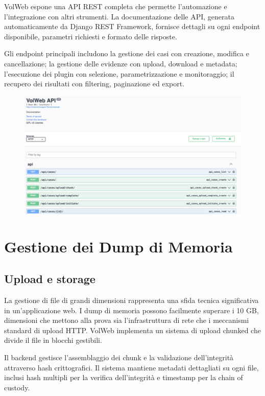 VolWeb espone una API REST completa che permette l'automazione e l'integrazione con altri strumenti. La documentazione delle API, generata automaticamente da Django REST Framework, fornisce dettagli su ogni endpoint disponibile, parametri richiesti e formato delle risposte.

Gli endpoint principali includono la gestione dei casi con creazione, modifica e cancellazione; la gestione delle evidenze con upload, download e metadata; l'esecuzione dei plugin con selezione, parametrizzazione e monitoraggio; il recupero dei risultati con filtering, paginazione ed export.

\begin{figure}[H]
    \centering
    \includegraphics[width=1\linewidth]{images/volweb-original/volweb-swagger.png}
\end{figure}

\section{Gestione dei Dump di Memoria}

\subsection{Upload e storage}

La gestione di file di grandi dimensioni rappresenta una sfida tecnica significativa in un'applicazione web. I dump di memoria possono facilmente superare i 10 GB, dimensioni che mettono alla prova sia l'infrastruttura di rete che i meccanismi standard di upload HTTP. VolWeb implementa un sistema di upload chunked che divide il file in blocchi gestibili.

Il backend gestisce l'assemblaggio dei chunk e la validazione dell'integrità attraverso hash crittografici. Il sistema mantiene metadati dettagliati su ogni file, inclusi hash multipli per la verifica dell'integrità e timestamp per la chain of custody.

